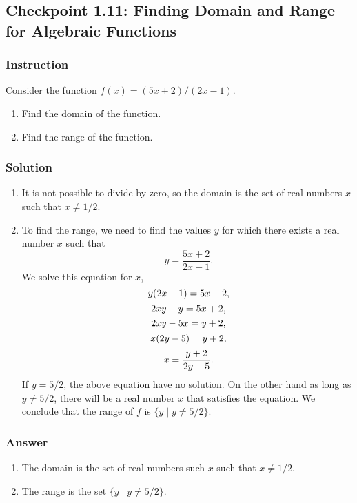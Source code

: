 \subsection*{Checkpoint 1.11: Finding Domain and Range for Algebraic Functions}

\subsubsection*{Instruction}

Consider the function $ f(x) = (5x + 2) / (2x - 1) $.

\begin{enumerate}[label = (\alph*)]
  \item
    Find the domain of the function.
  \item
    Find the range of the function.
\end{enumerate}

\subsubsection*{Solution}

\begin{enumerate}[label = (\alph*)]
  \item
    It is not possible to divide by zero, so the domain is the set of real numbers $ x $ such that $ x \ne 1/2 $.
  \item
    To find the range, we need to find the values $ y $ for which there exists a real number $ x $ such that
    \[ \phantom{.} y = \frac{5x + 2}{2x - 1} \text{.} \]
    We solve this equation for $ x $,
    \[ \phantom{,} y(2x - 1) = 5x + 2 \text, \]
    \[ \phantom{,} 2xy - y = 5x + 2 \text, \]
    \[ \phantom{,} 2xy - 5x = y + 2 \text, \]
    \[ \phantom{,} x(2y - 5) = y + 2 \text, \]
    \[ \phantom{.} x = \frac{y + 2}{2y - 5} \text. \]
    If $ y = 5/2 $, the above equation have no solution. On the other hand as long as $ y \ne 5/2 $, there will be a real number $ x $ that satisfies the equation. We conclude that the range of $ f $ is $ \{ y \mid y \ne 5/2 \} $.
\end{enumerate}

\subsubsection*{Answer}

\begin{enumerate}[label = (\alph*)]
  \item
    The domain is the set of real numbers such $ x $ such that $ x \ne 1/2 $.
  \item
    The range is the set $ \{ y \mid y \ne 5/2 \} $.
\end{enumerate}
